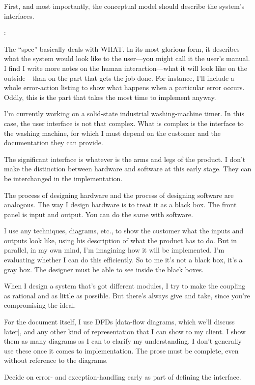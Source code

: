 \begin{tip}
First, and most importantly, the conceptual model should describe the
system's interfaces.
\end{tip}%
\begin{interview}
:

\begin{tfquot}
The ``spec'' basically deals with WHAT. In its most glorious form, it
describes what the system would look like to the user---you might call it
the user's manual. I find I write more notes on the human
interaction---what it
will look like on the outside---than on the part that gets the job
done. For instance, I'll include a whole error-action listing to show
what happens when a particular error occurs. Oddly, this is the part
that takes the most time to implement anyway.

I'm currently working on a solid-state industrial washing-machine
timer. In this case, the user interface is not that complex. What is
complex is the interface to the washing machine, for which I must
depend on the customer and the documentation they can provide.

The significant interface is whatever is the arms and legs of the
product. I don't make the distinction between hardware and software at
this early stage. They can be interchanged in the implementation.

The process of designing hardware and the process of designing
software are analogous. The way I design hardware is to treat it as a
black box. The front panel is input and output. You can do the same
with software.

I use any techniques, diagrams, etc., to show the customer what the
inputs and outputs look like, using his description of what the
product has to do.  But in parallel, in my own mind, I'm imagining how
it will be implemented.  I'm evaluating whether I can do this
efficiently. So to me it's not a black box, it's a gray box. The
designer must be able to see inside the black boxes.

When I design a system that's got different modules, I try to make the
coupling as rational and as little as possible. But there's always
give and take, since you're compromising the ideal.

For the document itself, I use DFDs {[}data-flow diagrams, which we'll
discuss later{]}, and any other kind of representation that I can show
to my client. I show them as many diagrams as I can to clarify my
understanding.  I don't generally use these once it comes to
implementation. The prose must be complete, even without reference to
the diagrams.
\end{tfquot}%
\end{interview}%
\begin{tip}
Decide on error- and exception-handling early as part of defining the
interface.
\end{tip}


